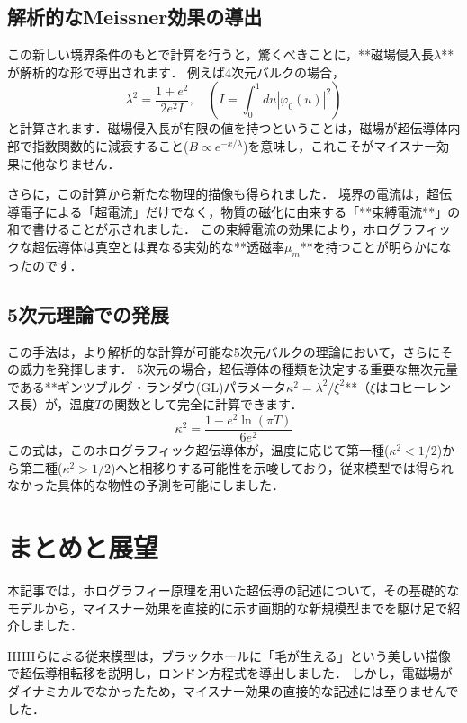 \documentclass[b5paper,11pt,dvipdfmx]{jsarticle}
\numberwithin{equation}{section}
\theoremstyle{definition}
\begin{document}
\subsection{解析的なMeissner効果の導出}

この新しい境界条件のもとで計算を行うと，驚くべきことに，**磁場侵入長$\lambda$**が解析的な形で導出されます\cite{Natsuume22}．
例えば4次元バルクの場合，
$$ \lambda^2 = \frac{1+e^2}{2e^2 I}, \quad \left(I = \int_0^1 du |\varphi_0(u)|^2\right) $$
と計算されます．磁場侵入長が有限の値を持つということは，磁場が超伝導体内部で指数関数的に減衰すること($B \propto e^{-x/\lambda}$)を意味し，これこそがマイスナー効果に他なりません．

さらに，この計算から新たな物理的描像も得られました．
境界の電流は，超伝導電子による「超電流」だけでなく，物質の磁化に由来する「**束縛電流**」の和で書けることが示されました．
この束縛電流の効果により，ホログラフィックな超伝導体は真空とは異なる実効的な**透磁率$\mu_m$**を持つことが明らかになったのです．

\subsection{5次元理論での発展}

この手法は，より解析的な計算が可能な5次元バルクの理論において，さらにその威力を発揮します．
5次元の場合，超伝導体の種類を決定する重要な無次元量である**ギンツブルグ・ランダウ(GL)パラメータ$\kappa^2 = \lambda^2 / \xi^2$**（$\xi$はコヒーレンス長）が，温度$T$の関数として完全に計算できます\cite{Natsuume22}．
$$ \kappa^2 = \frac{1 - e^2 \ln(\pi T)}{6e^2} $$
この式は，このホログラフィック超伝導体が，温度に応じて第一種($\kappa^2 < 1/2$)から第二種($\kappa^2 > 1/2$)へと相移りする可能性を示唆しており，従来模型では得られなかった具体的な物性の予測を可能にしました．

\clearpage

\section{まとめと展望}

本記事では，ホログラフィー原理を用いた超伝導の記述について，その基礎的なモデルから，マイスナー効果を直接的に示す画期的な新規模型までを駆け足で紹介しました．

HHHらによる従来模型は，ブラックホールに「毛が生える」という美しい描像で超伝導相転移を説明し，ロンドン方程式を導出しました．
しかし，電磁場がダイナミカルでなかったため，マイスナー効果の直接的な記述には至りませんでした．
\end{document}
